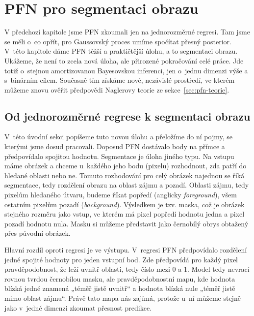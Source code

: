 \chapter{PFN pro segmentaci obrazu}
\label{chap:segmentace}


V předchozí kapitole jsme PFN zkoumali jen na jednorozměrné regresi.
Tam jsme se měli o~co opřít, pro Gaussovský proces umíme spočítat přesný posterior.
V~této kapitole dáme PFN těžší a praktičtější úlohu, a to segmentaci obrazu.
Ukážeme, že není to zcela nová úloha, ale přirozené pokračování celé práce.
Jde totiž o~stejnou amortizovanou Bayesovskou inferenci, jen o~jednu dimenzi výše a s~binárním cílem.
Současně tím získáme nové, nezávislé prostředí, ve kterém můžeme znovu ověřit předpovědi Naglerovy teorie ze sekce~\ref{sec:pfn-teorie}.

\section{Od jednorozměrné regrese k segmentaci obrazu}
\label{sec:seg-uvod}

V~této úvodní sekci popíšeme tuto novou úlohu a přeložíme do ní pojmy, se kterými jsme dosud pracovali.
Doposud PFN dostávalo body na přímce a předpovídalo spojitou hodnotu.
Segmentace je úloha jiného typu.
Na vstupu máme obrázek a chceme u~každého jeho bodu (pixelu) rozhodnout, zda patří do hledané oblasti nebo ne.
Tomuto rozhodování pro celý obrázek najednou se říká segmentace, tedy rozdělení obrazu na oblast zájmu a pozadí.
Oblasti zájmu, tedy pixelům hledaného útvaru, budeme říkat popředí (anglicky \emph{foreground}), všem ostatním pixelům pozadí (\emph{background}).
Výsledkem je tzv. maska, což je obrázek stejného rozměru jako vstup, ve kterém má pixel popředí hodnotu jedna a pixel pozadí hodnotu nula.
Masku si můžeme představit jako černobílý obrys obtažený přes původní obrázek.
\par

Hlavní rozdíl oproti regresi je ve výstupu.
V~regresi PFN předpovídalo rozdělení jedné spojité hodnoty pro jeden vstupní bod.
Zde předpovídá pro každý pixel pravděpodobnost, že leží uvnitř oblasti, tedy číslo mezi $0$ a $1$.
Model tedy nevrací rovnou tvrdou černobílou masku, ale pravděpodobnostní mapu, kde hodnota blízká jedné znamená „téměř jistě uvnitř“ a hodnota blízká nule „téměř jistě mimo oblast zájmu“.
Právě tato mapa nás zajímá, protože u~ní můžeme stejně jako v~jedné dimenzi zkoumat přesnost predikce.
\par

